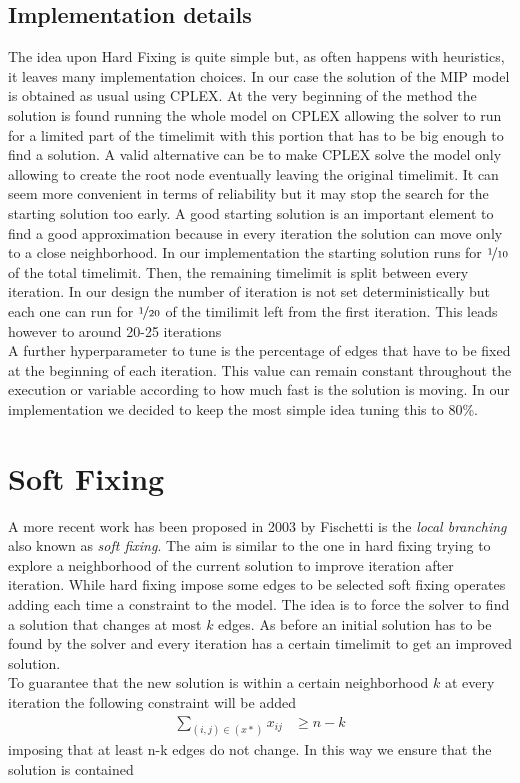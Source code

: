 \subsection{Implementation details}
The idea upon Hard Fixing is quite simple but, as often happens with
heuristics, it leaves many implementation choices. In our case the solution of
the MIP model is obtained as usual using CPLEX. At the very beginning of the
method the solution is found running the whole model on CPLEX allowing the
solver to run for a limited part of the timelimit with this portion that has to
be big enough to find a solution. A valid alternative can be to make CPLEX
solve the model only allowing to create the root node eventually leaving the
original timelimit. It can seem more convenient in terms of reliability but it
may stop the search for the starting solution too early. A good starting
solution is an important element to find a good approximation because in every
iteration the solution can move only to a close neighborhood. In our
implementation the starting solution runs for $\nicefrac{1}{10}$ of the total
timelimit. Then, the remaining timelimit is split between every iteration. In
our design the number of iteration is not set deterministically but each one
can run for $\nicefrac{1}{20}$ of the timilimit left from the first iteration. This
leads however to around 20-25 iterations\\ A further hyperparameter to tune is
the percentage of edges that have to be fixed at the beginning of each
iteration. This value can remain constant throughout the execution or variable
according to how much fast is the solution is moving. In our implementation we
decided to keep the most simple idea tuning this to 80\%.

\section{Soft Fixing}
A more recent work has been proposed in 2003 by Fischetti
\cite{fischetti2003local} is the \emph{local branching} also known as \emph{soft fixing}. The
aim is similar to the one in hard fixing trying to explore a neighborhood of
the current solution to improve iteration after iteration. While hard fixing
impose some edges to be selected soft fixing operates adding each time a
constraint to the model. The idea is to force the solver to find a solution
that changes at most $k$ edges. As before an initial solution has to be found by
the solver and every iteration has a certain timelimit to get an improved
solution. \\ To guarantee that the new solution is within a certain
neighborhood $k$ at every iteration the following constraint will be added \\
\begin{equation*} \begin{array}{rrlr} \displaystyle\sum_{(i,j) \in (x*)} x_{ij}
& \ge n-k \end{array} \end{equation*} imposing that at least n-k edges do not
change. In this way we ensure that the solution is contained

